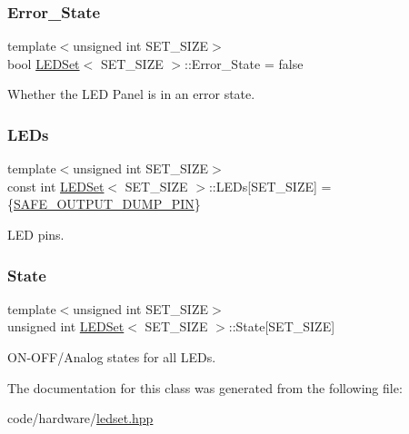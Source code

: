 \subsubsection{\texorpdfstring{Error\+\_\+\+State}{Error\_State}}
{\footnotesize\ttfamily template$<$unsigned int S\+E\+T\+\_\+\+S\+I\+ZE$>$ \\
bool \hyperlink{classLEDSet}{L\+E\+D\+Set}$<$ S\+E\+T\+\_\+\+S\+I\+ZE $>$\+::Error\+\_\+\+State = false}



Whether the L\+ED Panel is in an error state. 

\mbox{\label{classLEDSet_a76dfe34c89f6161184583a5ffdcad2e1}} 
\subsubsection{\texorpdfstring{L\+E\+Ds}{LEDs}}
{\footnotesize\ttfamily template$<$unsigned int S\+E\+T\+\_\+\+S\+I\+ZE$>$ \\
const int \hyperlink{classLEDSet}{L\+E\+D\+Set}$<$ S\+E\+T\+\_\+\+S\+I\+ZE $>$\+::L\+E\+Ds\mbox{[}S\+E\+T\+\_\+\+S\+I\+ZE\mbox{]} = \{\hyperlink{pins_8hpp_a2b2fb4f846b45d396215a25f949a1bc7}{S\+A\+F\+E\+\_\+\+O\+U\+T\+P\+U\+T\+\_\+\+D\+U\+M\+P\+\_\+\+P\+IN}\}}



L\+ED pins. 

\mbox{\label{classLEDSet_a7185bf98d8866da93847fde7b2145cc4}} 
\subsubsection{\texorpdfstring{State}{State}}
{\footnotesize\ttfamily template$<$unsigned int S\+E\+T\+\_\+\+S\+I\+ZE$>$ \\
unsigned int \hyperlink{classLEDSet}{L\+E\+D\+Set}$<$ S\+E\+T\+\_\+\+S\+I\+ZE $>$\+::State\mbox{[}S\+E\+T\+\_\+\+S\+I\+ZE\mbox{]}}



O\+N-\/\+O\+F\+F/\+Analog states for all L\+E\+Ds. 



The documentation for this class was generated from the following file\+:\begin{DoxyCompactItemize}
\item 
code/hardware/\hyperlink{ledset_8hpp}{ledset.\+hpp}\end{DoxyCompactItemize}
